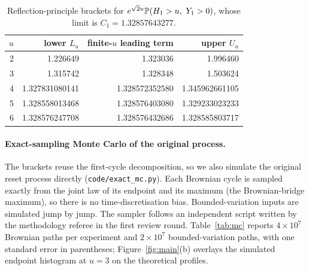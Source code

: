 \documentclass[11pt,a4paper]{article}
\begin{document}
\begin{table}[h]
\centering\small
\begin{tabular}{@{}rrrr@{}}
\toprule
$u$ & lower $L_u$ & finite-$u$ leading term & upper $U_u$\\
\midrule
2 & 1.226649 & 1.323036 & 1.996460\\
3 & 1.315742 & 1.328348 & 1.503624\\
4 & 1.327831080141 & 1.328572352580 & 1.345962661105\\
5 & 1.328558013468 & 1.328576403080 & 1.329233023233\\
6 & 1.328576247708 & 1.328576432686 & 1.328585803717\\
\bottomrule
\end{tabular}
\caption{Reflection-principle brackets for $e^{\sqrt2u}\mathbb P(H_1>u,\ Y_1>0)$, whose limit is $C_1=1.32857643277$.}
\label{tab:brackets}
\end{table}

\paragraph{Exact-sampling Monte Carlo of the original process.}
The brackets reuse the first-cycle decomposition, so we also simulate the original reset process directly (\texttt{code/exact\_mc.py}). Each Brownian cycle is sampled exactly from the joint law of its endpoint and its maximum (the Brownian-bridge maximum), so there is no time-discretisation bias. Bounded-variation inputs are simulated jump by jump. The sampler follows an independent script written by the methodology referee in the first review round. Table~\ref{tab:mc} reports $4\times10^7$ Brownian paths per experiment and $2\times10^7$ bounded-variation paths, with one standard error in parentheses; Figure~\ref{fig:main}(b) overlays the simulated endpoint histogram at $u=3$ on the theoretical profiles.
\end{document}
